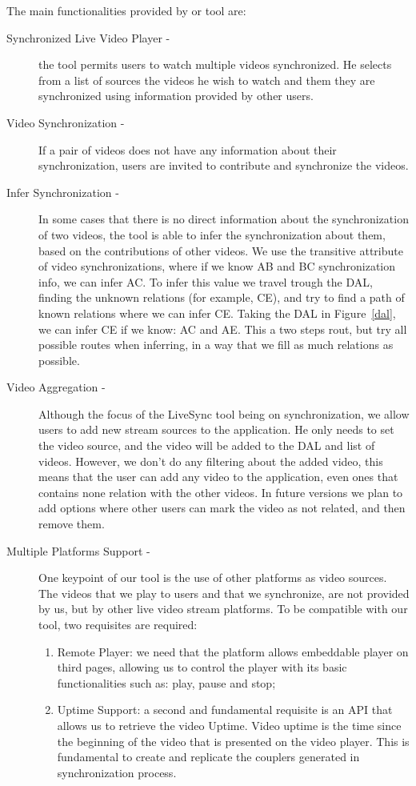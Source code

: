 The main functionalities provided by or tool are:
\begin{description}
	\item[Synchronized Live Video Player -]	the tool permits users to watch multiple videos synchronized. He selects from a list of sources the videos he wish to watch and them they are synchronized using information provided by other users.
	
	\item[Video Synchronization -] If a pair of videos does not have any information about their synchronization, users are invited to contribute and synchronize the videos.
	
	\item[Infer Synchronization -] In some cases that there is no direct information about the synchronization of two videos, the tool is able to infer the synchronization about them, based on the contributions of other videos. We use the transitive attribute of video synchronizations, where if we know AB and BC synchronization info, we can infer AC. To infer this value we travel trough the DAL, finding the unknown relations (for example, CE), and try to find a path of known relations where we can infer CE. Taking the DAL in Figure~\ref{dal}, we can infer CE if we know: AC and AE. This a two steps rout, but try all possible routes when inferring, in a way that we fill as much relations as possible.
	
	\item[Video Aggregation -]	Although the focus of the LiveSync tool being on synchronization, we allow users to add new stream sources to the application. He only needs to set the video source, and the video will be added to the DAL and list of videos. However, we don't do any filtering about the added video, this means that the user can add any video to the application, even ones that contains none relation with the other videos. In future versions we plan to add options where other users can mark the video as not related, and then remove them.
	
	\item[Multiple Platforms Support -] One keypoint of our tool is the use of other platforms as video sources. The videos that we play to users and that we synchronize, are not provided by us, but by other live video stream platforms. To be compatible with our tool, two requisites are required:
	\begin{enumerate}
		\item Remote Player: we need that the platform allows embeddable player on third pages, allowing us to control the player with its basic functionalities such as: play, pause and stop;
		\item Uptime Support: a second and fundamental requisite is an API that allows us to retrieve the video Uptime. Video uptime is the time since the beginning of the video that is presented on the video player. This is fundamental to create and replicate the couplers generated in synchronization process.
	\end{enumerate}
	

\end{description}
